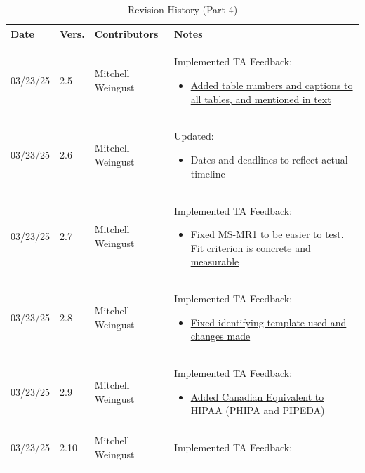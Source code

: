 \documentclass[12pt]{article}
\begin{document}
\begin{table}[H]
  \centering
  \caption{Revision History (Part 4)}
  \label{TblRevisionHistoryPart1}
  \begin{tabularx}{\textwidth}{p{1.5cm} p{1cm} p{3.5cm} X}
      \toprule
      \textbf{Date} & \textbf{Vers.} & \textbf{Contributors} & \textbf{Notes} \\
      \midrule
      03/23/25 & 2.5 & Mitchell Weingust & Implemented TA Feedback: 
      \begin{itemize}[leftmargin=*]
        \item \href{https://github.com/parishanizam/TeleHealth/issues/193}{Added table numbers and captions to all tables, and mentioned in text}
      \end{itemize} \\
      03/23/25 & 2.6 & Mitchell Weingust & Updated: 
      \begin{itemize}[leftmargin=*]
        \item Dates and deadlines to reflect actual timeline
      \end{itemize} \\
      03/23/25 & 2.7 & Mitchell Weingust & Implemented TA Feedback: 
      \begin{itemize}[leftmargin=*]
        \item \href{https://github.com/parishanizam/TeleHealth/issues/196}{Fixed MS-MR1 to be easier to test. Fit criterion is concrete and measurable}
      \end{itemize} \\
      03/23/25 & 2.8 & Mitchell Weingust & Implemented TA Feedback: 
      \begin{itemize}[leftmargin=*]
        \item \href{https://github.com/parishanizam/TeleHealth/issues/188}{Fixed identifying template used and changes made}
      \end{itemize} \\
      03/23/25 & 2.9 & Mitchell Weingust & Implemented TA Feedback: 
      \begin{itemize}[leftmargin=*]
        \item \href{https://github.com/parishanizam/TeleHealth/issues/186}{Added Canadian Equivalent to HIPAA (PHIPA and PIPEDA)}
      \end{itemize} \\
      03/23/25 & 2.10 & Mitchell Weingust & Implemented TA Feedback: 
      \begin{itemize}[leftmargin=*]

\end{itemize}
\end{tabularx}
\end{table}
\end{document}
